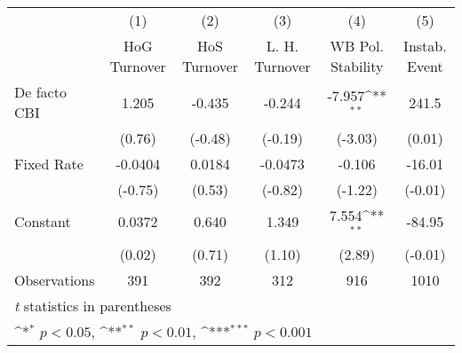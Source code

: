 \begin{table}[htbp]\centering
\def\sym#1{\ifmmode^{#1}\else\(^{#1}\)\fi}
\caption{\label{lowKIfivs2}}
\begin{tabular}{l*{5}{c}}
\toprule
                                        &\multicolumn{1}{c}{(1)}&\multicolumn{1}{c}{(2)}&\multicolumn{1}{c}{(3)}&\multicolumn{1}{c}{(4)}&\multicolumn{1}{c}{(5)}\\
                                        &\multicolumn{1}{c}{HoG Turnover}&\multicolumn{1}{c}{HoS Turnover}&\multicolumn{1}{c}{L. H. Turnover}&\multicolumn{1}{c}{WB Pol. Stability}&\multicolumn{1}{c}{Instab. Event}\\
\midrule
De facto CBI                            &    1.205         &   -0.435         &   -0.244         &   -7.957\sym{**} &    241.5         \\
                                        &   (0.76)         &  (-0.48)         &  (-0.19)         &  (-3.03)         &   (0.01)         \\
\addlinespace
Fixed Rate                              &  -0.0404         &   0.0184         &  -0.0473         &   -0.106         &   -16.01         \\
                                        &  (-0.75)         &   (0.53)         &  (-0.82)         &  (-1.22)         &  (-0.01)         \\
\addlinespace
Constant                                &   0.0372         &    0.640         &    1.349         &    7.554\sym{**} &   -84.95         \\
                                        &   (0.02)         &   (0.71)         &   (1.10)         &   (2.89)         &  (-0.01)         \\
\midrule
Observations                            &      391         &      392         &      312         &      916         &     1010         \\
\bottomrule
\multicolumn{6}{l}{\footnotesize \textit{t} statistics in parentheses}\\
\multicolumn{6}{l}{\footnotesize \sym{*} \(p<0.05\), \sym{**} \(p<0.01\), \sym{***} \(p<0.001\)}\\
\end{tabular}
\end{table}
